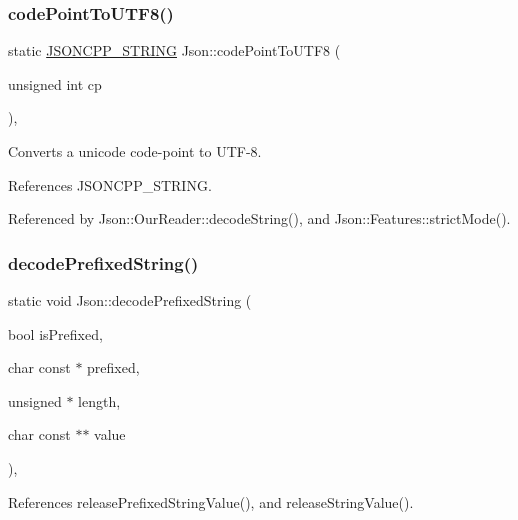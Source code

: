 \subsubsection{\texorpdfstring{code\+Point\+To\+U\+T\+F8()}{codePointToUTF8()}}
{\footnotesize\ttfamily static \hyperlink{json_8h_a1e723f95759de062585bc4a8fd3fa4be_a1e723f95759de062585bc4a8fd3fa4be}{J\+S\+O\+N\+C\+P\+P\+\_\+\+S\+T\+R\+I\+NG} Json\+::code\+Point\+To\+U\+T\+F8 (\begin{DoxyParamCaption}\item[{unsigned int}]{cp }\end{DoxyParamCaption})\hspace{0.3cm}{\ttfamily [inline]}, {\ttfamily [static]}}



Converts a unicode code-\/point to U\+T\+F-\/8. 



References J\+S\+O\+N\+C\+P\+P\+\_\+\+S\+T\+R\+I\+NG.



Referenced by Json\+::\+Our\+Reader\+::decode\+String(), and Json\+::\+Features\+::strict\+Mode().

\mbox{\label{namespaceJson_aad8b4982c1acd164f541fba396ac9fb1_aad8b4982c1acd164f541fba396ac9fb1}} 
\subsubsection{\texorpdfstring{decode\+Prefixed\+String()}{decodePrefixedString()}}
{\footnotesize\ttfamily static void Json\+::decode\+Prefixed\+String (\begin{DoxyParamCaption}\item[{bool}]{is\+Prefixed,  }\item[{char const $\ast$}]{prefixed,  }\item[{unsigned $\ast$}]{length,  }\item[{char const $\ast$$\ast$}]{value }\end{DoxyParamCaption})\hspace{0.3cm}{\ttfamily [inline]}, {\ttfamily [static]}}



References release\+Prefixed\+String\+Value(), and release\+String\+Value().



